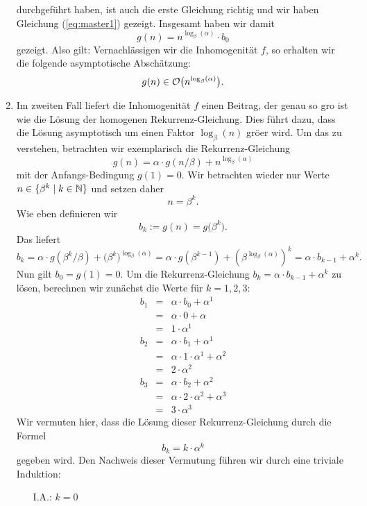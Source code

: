 \begin{enumerate}
durchgef\"uhrt haben, ist auch die erste Gleichung richtig und wir haben Gleichung (\ref{eq:master1}) gezeigt.
Insgesamt haben wir damit 
\[ g(n) = n^{\log_\beta(\alpha)} \cdot b_0 \]
gezeigt.  Also gilt: Vernachl\"assigen wir die Inhomogenit\"at $f$, so erhalten wir
die folgende asymptotische Absch\"atzung:
\[ g(n) \in \mathcal{O}\bigl(n^{\log_\beta(\alpha)}\bigr). \]
\item Im zweiten Fall liefert
die Inhomogenit\"at $f$ einen Beitrag, der genau so gro\3 ist wie die L\"osung der homogenen
Rekurrenz-Gleichung.  Dies f\"uhrt dazu, dass die L\"osung asymptotisch um einen Faktor
$\log_\beta(n)$ gr\"o\3er wird.  Um das zu verstehen, betrachten wir exemplarisch die Rekurrenz-Gleichung
\[ g(n) = \alpha \cdot g\left(n/\beta\right) + n^{\log_\beta(\alpha)} \]
mit der Anfangs-Bedingung $g(1) = 0$.  Wir betrachten wieder nur Werte 
$n \in \{ \beta^k \mid k \in {\mathbb N} \}$ und setzen daher
\[ n = \beta^k. \]
Wie eben definieren wir
\[ b_k := g(n) = g\bigl(\beta^k\bigr). \]
Das liefert
\[ b_k = \alpha \cdot g\left(\beta^k/\beta\right) + \bigl(\beta^k\bigr)^{\log_\beta(\alpha)}
       = \alpha \cdot g(\beta^{k-1}) + \left(\beta^{\log_\beta(\alpha)}\right)^k
       = \alpha \cdot b_{k-1} + \alpha^k.
 \]
Nun gilt $b_0 = g(1) = 0$.  Um die Rekurrenz-Gleichung $b_k = \alpha \cdot b_{k-1} + \alpha^k$ zu l\"osen,
berechnen wir zun\"achst die Werte f\"ur $k=1,2,3$:
\begin{eqnarray*}
  b_1 & = & \alpha \cdot b_0 + \alpha^1               \\
      & = & \alpha \cdot 0 + \alpha                   \\
      & = & 1 \cdot \alpha^1                          \\[0.2cm]
  b_2 & = & \alpha \cdot b_1 + \alpha^1               \\
      & = & \alpha \cdot 1 \cdot \alpha^1 + \alpha^2  \\
      & = & 2 \cdot \alpha^2                          \\[0.2cm]
  b_3 & = & \alpha \cdot b_2 + \alpha^2               \\
      & = & \alpha \cdot 2 \cdot \alpha^2 + \alpha^3  \\
      & = & 3 \cdot \alpha^3                          
\end{eqnarray*}
Wir vermuten hier, dass die L\"osung dieser Rekurrenz-Gleichung durch die Formel
\[ b_k = k \cdot \alpha^k \]
gegeben wird.  Den Nachweis dieser Vermutung f\"uhren wir durch eine triviale Induktion:
\begin{enumerate}
\item[I.A.:] $k = 0$
             

\end{enumerate}
\end{enumerate}
